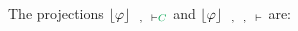 \documentclass{llncs}
\begin{document}
\begin{example}
\noindent
The projections $\projectionO{\varphi}{\hC{B}, \hD{A} \seq \hE{C}}$ and $\projectionO{\varphi}{\hC{B}, \hD{A}, \hF{C} \seq}$ are:
\begin{small}
\begin{multicols}{2}{
\begin{prooftree}
				 
			 
							 
\end{prooftree}

\begin{prooftree}
					 
				 
									 
									 
\end{prooftree}
}
\end{multicols}
\end{small}
\hfill\QED
\end{example}
\end{document}
